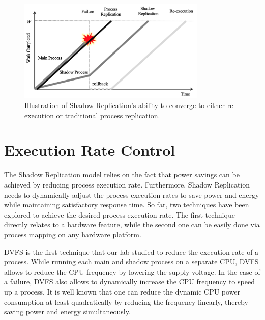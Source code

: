 \begin{figure}[t]
	\begin{center}
		\includegraphics[width=0.8\textwidth]{Figures/three_lines}
	\end{center}
	\caption{Illustration of Shadow Replication's ability to converge to either re-execution or traditional process replication.}
	\label{fig:three_lines}
\end{figure}

\section{Execution Rate Control}

The Shadow Replication model relies on the fact that power savings can be achieved by reducing process execution rate. Furthermore, Shadow Replication needs to dynamically adjust the process execution rates to save power and energy while maintaining satisfactory response time. So far, two techniques have been explored to achieve the desired process execution rate. The first technique directly relates to a hardware feature, while the second one can be easily done via process mapping on any hardware platform.

DVFS is the first technique that our lab studied to reduce the execution rate of a process. While running each main and shadow process on a separate CPU, DVFS allows to reduce the CPU frequency by lowering the supply voltage. In the case of a failure, DVFS also allows to dynamically increase the CPU frequency to speed up a process. It is well known that one can reduce the dynamic CPU power consumption at least quadratically by reducing the frequency linearly, thereby saving power and energy simultaneously. %

